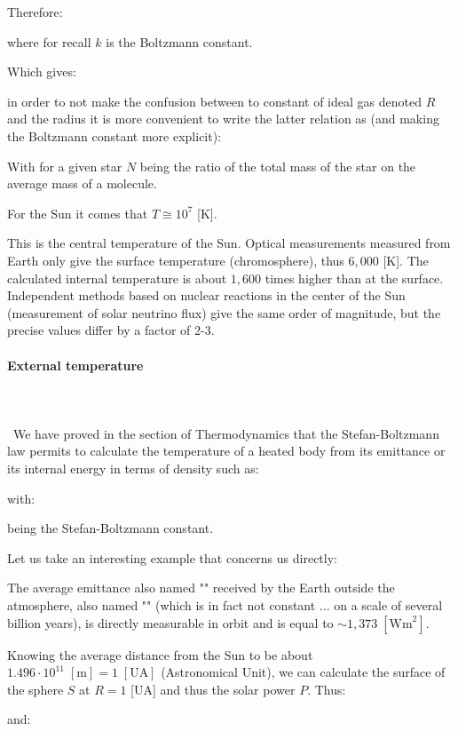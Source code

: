	Therefore:
	
	where for recall $k$ is the Boltzmann constant.

	Which gives:
	
	in order to not make the confusion between to constant of ideal gas denoted $R$ and the radius it is more convenient to write the latter relation as (and making the Boltzmann constant more explicit):
	
	With for a given star $N$ being the ratio of the total mass of the star on the average mass of a molecule.
	
	For the Sun it comes that $T\cong 10^7$ [K].
	
	This is the central temperature of the Sun. Optical measurements measured from Earth only give the surface temperature (chromosphere), thus $6,000$ [K]. The calculated internal temperature is about $1,600$ times higher than at the surface. Independent methods based on nuclear reactions in the center of the Sun (measurement of solar neutrino flux) give the same order of magnitude, but the precise values differ by a factor of $2$-$3$.
	
	\paragraph{External temperature}\mbox{}\\\\\
	We have proved in the section of Thermodynamics that the Stefan-Boltzmann law permits to calculate the temperature of a heated body from its emittance or its internal energy in terms of density such as:
	
	with:
	
	being the Stefan-Boltzmann constant.

	Let us take an interesting example that concerns us directly:
	
	The average emittance also named "" received by the Earth outside the atmosphere, also named "" (which is in fact not constant ... on a scale of several billion years), is directly measurable in orbit and is equal to $\sim 1,373\;[\text{Wm}^2]$.
	
	Knowing the average distance from the Sun to be about $1.496\cdot 10^{11}\;[\text{m}]=1\;[\text{UA}]$  (Astronomical Unit), we can calculate the surface of the sphere $S$ at $R=1$ [UA] and thus the solar power $P$. Thus:
	
	and:
	
